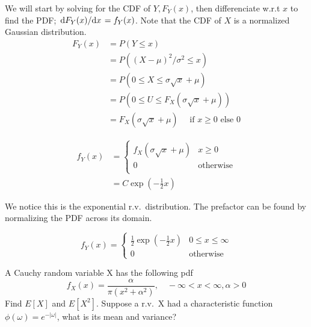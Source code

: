 \documentclass{article}
\begin{document}
    \begin{solution}
        We will start by solving for the CDF of $Y, F_Y(x)$, then differenciate w.r.t $x$ to find the PDF; $\dv*{F_Y(x)}{x} = f_Y(x)$. Note that the CDF of $X$ is a normalized Gaussian distribution.
        \begin{align*}
            F_Y(x) &= P(Y \leq x) \\
            &= P((X-\mu)^2/\sigma^2 \leq x) \\
            &= P(0 \leq X \leq \sigma \sqrt{x} + \mu)  \\
            &= P(0 \leq U \leq F_X(\sigma \sqrt{x} + \mu)) \\
            &= F_X(\sigma \sqrt{x} + \mu) \quad \text{ if } x \geq 0 \text{ else } 0
        \end{align*}

        \begin{align*}
            f_Y(x) &= 
            \begin{cases} 
                    f_X(\sigma \sqrt{x} + \mu) & x \geq 0 \\
                    0 & \text{otherwise}\\
            \end{cases} \\
            &= C\exp(-\frac{1}{2} x)
        \end{align*}

        We notice this is the exponential r.v.~distribution. The prefactor can be found by normalizing the PDF across its domain.

        \begin{equation}
            f_Y(x) = 
            \begin{cases}
                \frac{1}{2}\exp(-\frac{1}{2} x) & 0 \leq x \leq \infty \\
                0 & \text{otherwise} 
            \end{cases}
        \end{equation}
        
    \end{solution}

    \nextproblem
    \begin{problem}
        A Cauchy random variable X has the following pdf
        \begin{equation*}
            f_X(x) = \frac{\alpha} {\pi (x^2 + \alpha^2)}, \quad -\infty < x < \infty, \alpha > 0
        \end{equation*}
        Find $E[X]$ and $E[X^2]$. Suppose a r.v.~X had a characteristic function $\phi(\omega) = e^{-|\omega|}$, what is its mean and variance?
    \end{problem}
\end{document}
